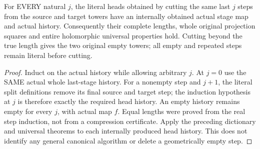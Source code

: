 \begin{theorem}
\label{hir:submersion-cartesian-tower-literal-heads}
\leanok
{}
For EVERY natural $j$, the literal heads obtained by cutting the same last
$j$ steps from the source and target towers have an internally obtained
actual stage map and actual history. Consequently their complete lengths,
whole original projection squares and entire holomorphic universal
properties hold. Cutting beyond the true length gives the two original
empty towers; all empty and repeated steps remain literal before cutting.
\end{theorem}
\begin{proof}
Induct on the actual history while allowing arbitrary $j$. At $j=0$ use
the SAME actual whole last-stage history. For a nonempty step and $j+1$,
the literal split definitions remove its final source and target step;
the induction hypothesis at $j$ is therefore exactly the required head
history. An empty history remains empty for every $j$, with actual map
$f$. Equal lengths were proved from the real step induction, not from a
compression certificate. Apply the preceding dictionary and universal
theorems to each internally produced head history. This does not identify
any general canonical algorithm or delete a geometrically empty step.
\end{proof}

